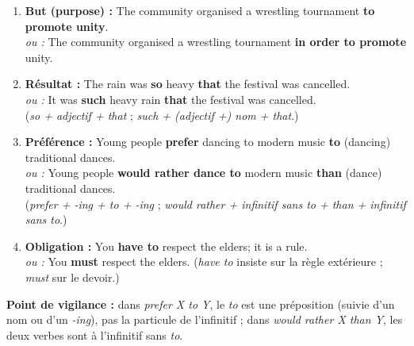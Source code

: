 \documentclass[11pt]{article}
\begin{document}
\begin{corrige}

\begin{enumerate}
\item \textbf{But (purpose) :} The community organised a wrestling tournament \textbf{to promote unity}. \\
\emph{ou :} The community organised a wrestling tournament \textbf{in order to promote} unity.

\item \textbf{Résultat :} The rain was \textbf{so} heavy \textbf{that} the festival was cancelled. \\
\emph{ou :} It was \textbf{such} heavy rain \textbf{that} the festival was cancelled. \\
(\emph{so + adjectif + that} ; \emph{such + (adjectif +) nom + that}.)

\item \textbf{Préférence :} Young people \textbf{prefer} dancing to modern music \textbf{to} (dancing) traditional dances. \\
\emph{ou :} Young people \textbf{would rather dance to} modern music \textbf{than} (dance) traditional dances. \\
(\emph{prefer + -ing + to + -ing} ; \emph{would rather + infinitif sans to + than + infinitif sans to}.)

\item \textbf{Obligation :} You \textbf{have to} respect the elders; it is a rule. \\
\emph{ou :} You \textbf{must} respect the elders. (\emph{have to} insiste sur la règle extérieure ; \emph{must} sur le devoir.)
\end{enumerate}

\textbf{Point de vigilance :} dans \emph{prefer X to Y}, le \emph{to} est une préposition (suivie d'un nom ou d'un \emph{-ing}), pas la particule de l'infinitif ; dans \emph{would rather X than Y}, les deux verbes sont à l'infinitif sans \emph{to}.
\end{corrige}
\end{document}
